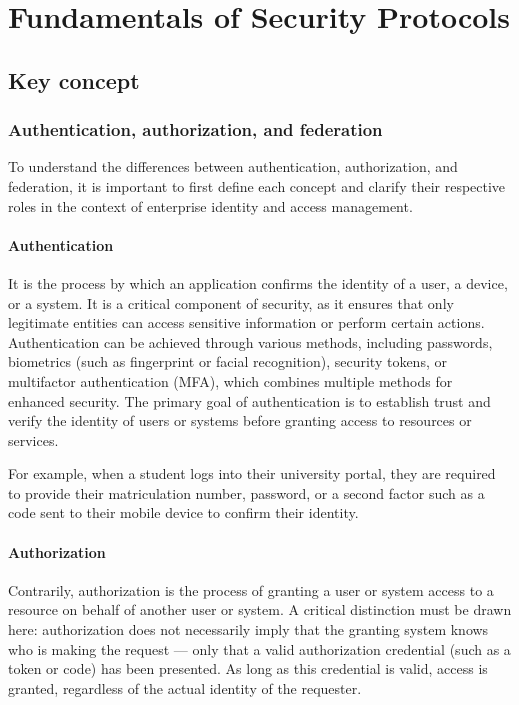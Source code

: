 \documentclass[../memoire.tex]{subfiles}
\begin{document}
\chapter{ Fundamentals of Security Protocols} \label{ch_prem}


\section{Key concept} \label{sec_un}


\subsection{Authentication, authorization, and federation} \label{sous_sec_un}

To understand the differences between authentication, authorization, and federation, it is important to first define each concept and clarify their respective roles in the context of enterprise identity and access management.

\subsubsection{Authentication}

It is the process by which an application confirms the identity of a user, a device, or a system. It is a critical component of security, as it ensures that only legitimate entities can access sensitive information or perform certain actions. Authentication can be achieved through various methods, including passwords, biometrics (such as fingerprint or facial recognition), security tokens, or multifactor authentication (MFA), which combines multiple methods for enhanced security. The primary goal of authentication is to establish trust and verify the identity of users or systems before granting access to resources or services\cite[p.~240]{richer2017}.

For example, when a student logs into their university portal, they are required to provide their matriculation number, password, or a second factor such as a code sent to their mobile device to confirm their identity. 

\subsubsection{Authorization}

Contrarily, authorization is the process of granting a user or system access to a resource on behalf of another user or system\cite[p.~5]{richer2017}. A critical distinction must be drawn here: authorization does not necessarily imply that the granting system knows who is making the request — only that a valid authorization credential (such as a token or code) has been presented. As long as this credential is valid, access is granted, regardless of the actual identity of the requester.
\end{document}
